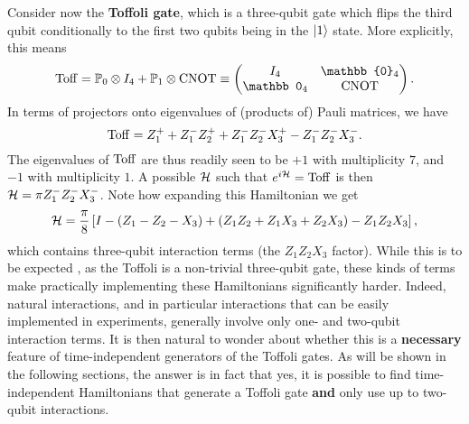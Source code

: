 \begin{example}
\label{ex:eigendecomposition_Toffoli}
Consider now the \textbf{Toffoli gate}, which is a three-qubit gate which flips the third qubit conditionally to the first two qubits being in the $\ket1$ state.
More explicitly, this means
\begin{equation}
    \Toff =
    \PP_0\otimes I_4 + \PP_1\otimes\CNOT
    \equiv
    \begin{pmatrix}
        I_4 & \mathbb{0}_4 \\
        \mathbb 0_4 & \CNOT
    \end{pmatrix}.
\end{equation}
In terms of projectors onto eigenvalues of (products of) Pauli matrices, we have
\begin{equation}
    \operatorname{Toff} = Z_1^+ + Z_1^- Z_2^+ + Z_1^- Z_2^- X_3^+ - Z_1^- Z_2^- X_3^-.
\end{equation}
The eigenvalues of $\operatorname{Toff}$ are thus readily seen to be $+1$ with multiplicity $7$, and $-1$ with multiplicity $1$.
A possible $\mathcal{H}$ such that $e^{i\cal H}=\operatorname{Toff}$ is then $\mathcal{H}=\pi Z_1^- Z_2^- X_3^-$.
Note how expanding this Hamiltonian we get
\begin{equation}
    \mathcal{H} = \frac{\pi}{8}\left[
        I - (Z_1 - Z_2 - X_3)
        + (Z_1 Z_2 + Z_1 X_3 + Z_2 X_3)
        - Z_1 Z_2 X_3
    \right],
\end{equation}
which contains three-qubit interaction terms (the $Z_1 Z_2 X_3$ factor). While this is to be expected , as the Toffoli is a non-trivial three-qubit gate, these kinds of terms make practically implementing these Hamiltonians significantly harder.
Indeed, natural interactions, and in particular interactions that can be easily implemented in experiments, generally  involve only one- and two-qubit interaction terms.
It is then natural to wonder about whether this is a \textbf{necessary} feature of time-independent generators of the Toffoli gates.
As will be shown in the following sections, the answer is in fact that yes, it is possible to find time-independent Hamiltonians that generate a Toffoli gate \textbf{and} only use up to two-qubit interactions.
\end{example}

